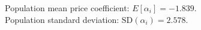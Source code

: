 Population mean price coefficient: $E[\alpha_i]=-1.839$.\\
Population standard deviation: $\mathrm{SD}(\alpha_i)=2.578$.
